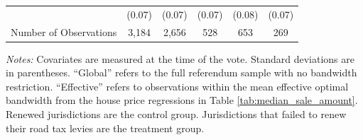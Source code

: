 \begin{table}[H]
\begin{tabular}{>{\raggedright\arraybackslash}p{3.4cm}ccccc}
                        & (0.07) & (0.07) & (0.07) & (0.08) & (0.07) \\
    Number of Observations & 3,184 & 2,656 & 528 & 653 & 269 \\
    \hline
    \end{tabular}
    \begin{minipage}{0.95\textwidth}
        \vspace{0.2em}
        \footnotesize \textit{Notes:} Covariates are measured at the time of the vote. Standard deviations are in parentheses. ``Global'' refers to the full referendum sample with no bandwidth restriction. ``Effective'' refers to observations within the mean effective optimal bandwidth from the house price regressions in Table \ref{tab:median_sale_amount}. Renewed jurisdictions are the control group. Jurisdictions that failed to renew their road tax levies are the treatment group.
    \end{minipage}
    \endgroup
\end{table}




